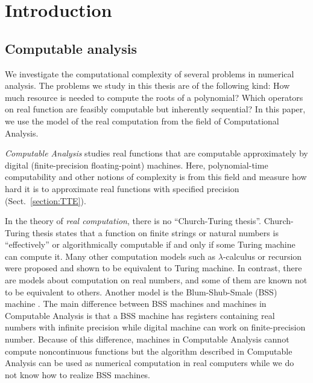 \documentclass[envcountsame,orivec,oribibl]{llncs}
\begin{document}
\section{Introduction}

\subsection{Computable analysis}

We investigate the computational complexity of several problems in 
numerical analysis.
The problems we study in this thesis are of the following kind:
How much resource is needed to compute the roots of a polynomial?
Which operators on real function are feasibly computable but inherently sequential?
In this paper, we use the model of the real computation from the field of 
Computational Analysis.

\emph{Computable Analysis} 
\cite{ko1991complexity,weihrauch00:_comput_analy}
studies real functions that are computable approximately 
by digital (finite-precision floating-point) machines.
Here, polynomial-time computability and other notions of complexity 
is from this field and measure how hard it is to approximate real functions
with specified precision  (Sect.~\ref{section:TTE}). 

In the theory of \emph{real computation}, 
there is no ``Church-Turing thesis''.
Church-Turing thesis states that a function on finite strings or natural 
numbers is ``effectively'' or algorithmically computable 
if and only if some Turing machine can compute it.
Many other computation models such as $\lambda$-calculus or recursion
were proposed and shown to be equivalent to Turing machine.
In contrast, there are models about computation on real numbers, 
and some of them are known not to be equivalent to others.
Another model is the Blum-Shub-Smale (BSS) machine \cite{blum1988theory}.
The main difference between BSS machines and machines in Computable Analysis is
that a BSS machine has registers containing real numbers with infinite precision
while digital machine can work on finite-precision number.
Because of this difference,
machines in Computable Analysis cannot compute noncontinuous functions
but the algorithm described in Computable Analysis 
can be used as numerical computation in real computers
 while we do not know
how to realize BSS machines.
\end{document}
